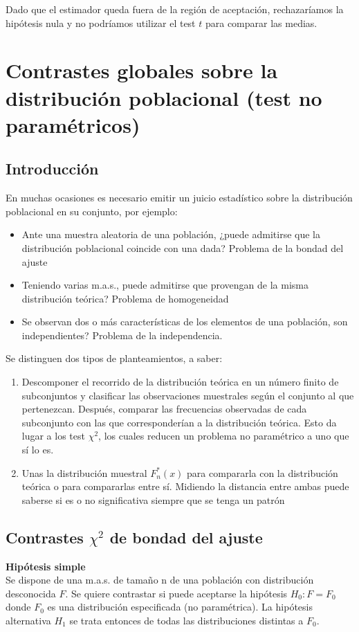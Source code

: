 \documentclass[a4paper,12pt]{article}
\begin{document}
    Dado que el estimador queda fuera de la región de aceptación, rechazaríamos la hipótesis nula y no podríamos utilizar el test $t$ para comparar las medias.
   

\section{Contrastes globales sobre la distribución poblacional (test no paramétricos)}

\subsection{Introducción}
En muchas ocasiones es necesario emitir un juicio estadístico sobre la distribución poblacional en su conjunto, por ejemplo:
\begin{itemize}
\item Ante una muestra aleatoria de una población, ¿puede admitirse que la distribución poblacional coincide con una dada? Problema de la bondad del ajuste
\item Teniendo varias m.a.s., puede admitirse que provengan de la misma distribución teórica? Problema de homogeneidad
\item Se observan dos o más características de los elementos de una población, son independientes? Problema de la independencia.
\end{itemize}

Se distinguen dos tipos de planteamientos, a saber:
\begin{enumerate}
\item Descomponer el recorrido de la distribución teórica en un número finito de subconjuntos y clasificar las observaciones muestrales según el conjunto al que pertenezcan. Después, comparar las frecuencias observadas de cada subconjunto con las que corresponderían a la distribución teórica. Esto da lugar a los test $\chi^2$, los cuales reducen un problema no paramétrico a uno que sí lo es.
\item Unas la distribución muestral $F^*_n(x)$ para compararla con la distribución teórica o para compararlas entre sí. Midiendo la distancia entre ambas puede saberse si es o no significativa siempre que se tenga un patrón
\end{enumerate}

\subsection{Contrastes $\chi^2$ de bondad del ajuste}
\textbf{Hipótesis simple} \\
Se dispone de una m.a.s. de tamaño n de una población con distribución desconocida $F$. Se quiere contrastar si puede aceptarse la hipótesis $H_0 : F = F_0$ donde $F_0$ es una distribución especificada (no paramétrica). La hipótesis alternativa $H_1$ se trata entonces de todas las distribuciones distintas a $F_0$.
\end{document}

